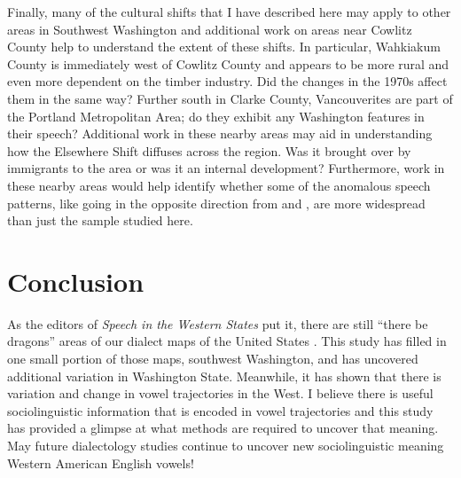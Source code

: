Finally, many of the cultural shifts that I have described here may apply to other areas in Southwest Washington and additional work on areas near Cowlitz County help to understand the extent of these shifts. In particular, Wahkiakum County is immediately west of Cowlitz County and appears to be more rural and even more dependent on the timber industry. Did the changes in the 1970s affect them in the same way? Further south in Clarke County, Vancouverites are part of the Portland Metropolitan Area; do they exhibit any Washington features in their speech? Additional work in these nearby areas may aid in understanding how the Elsewhere Shift diffuses across the region. Was it brought over by immigrants to the area or was it an internal development? Furthermore, work in these nearby areas would help identify whether some of the anomalous speech patterns, like \ben going in the opposite direction from \ban and \bin, are more widespread than just the sample studied here.





\section{Conclusion}

As the editors of \textit{Speech in the Western States} put it, there are still ``there be dragons'' areas of our dialect maps of the United States \citep[172]{fridland_etal_2017_pads}. This study has filled in one small portion of those maps, southwest Washington, and has uncovered additional variation in Washington State. Meanwhile, it has shown that there is variation and change in vowel trajectories in the West. I believe there is useful sociolinguistic information that is encoded in vowel trajectories and this study has provided a glimpse at what methods are required to uncover that meaning. May future dialectology studies continue to uncover new sociolinguistic meaning Western American English vowels!
